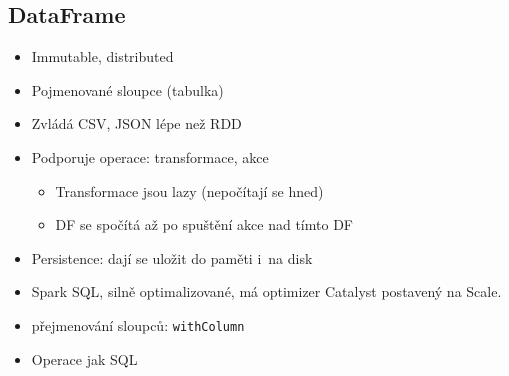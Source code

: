 \subsection{DataFrame}
\begin{itemize}
    \item Immutable, distributed
    \item Pojmenované sloupce (tabulka)
    \item Zvládá CSV, JSON lépe než RDD
    \item Podporuje operace: transformace, akce
    \begin{itemize}
        \item Transformace jsou lazy (nepočítají se hned)
        \item DF se spočítá až po spuštění akce nad tímto DF
    \end{itemize}
    \item Persistence: dají se uložit do paměti i~na disk
    \item Spark SQL, silně optimalizované, má optimizer Catalyst postavený na Scale.
    \item přejmenování sloupců: \texttt{withColumn}
    \item Operace jak SQL
\end{itemize}

